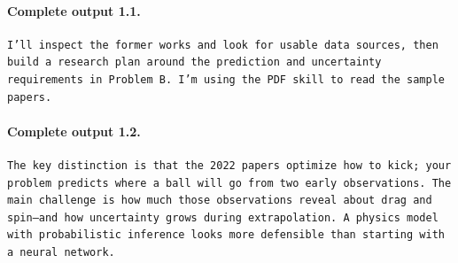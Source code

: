 \documentclass[UTF8,10pt]{ctexart}
\begin{document}
\paragraph{Complete output 1.1.}
\begin{Verbatim}[breaklines=true,breakanywhere=true,fontsize=\scriptsize,frame=single,framesep=2pt]
I’ll inspect the former works and look for usable data sources, then build a research plan around the prediction and uncertainty requirements in Problem B. I’m using the PDF skill to read the sample papers.
\end{Verbatim}

\paragraph{Complete output 1.2.}
\begin{Verbatim}[breaklines=true,breakanywhere=true,fontsize=\scriptsize,frame=single,framesep=2pt]
The key distinction is that the 2022 papers optimize how to kick; your problem predicts where a ball will go from two early observations. The main challenge is how much those observations reveal about drag and spin—and how uncertainty grows during extrapolation. A physics model with probabilistic inference looks more defensible than starting with a neural network.
\end{Verbatim}
\end{document}
